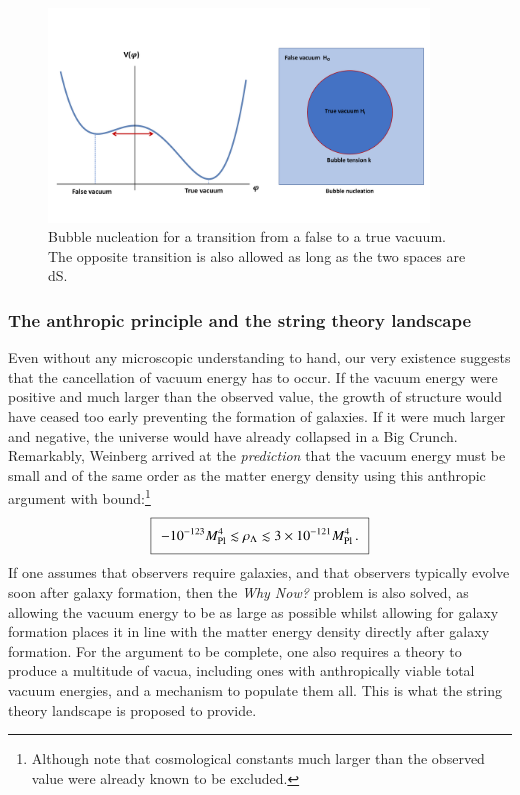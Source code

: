 \begin{figure}[ht]
\centering
\includegraphics[width = 0.9\textwidth]{Sections/Figures/VacuumTransition.pdf} 
\caption{Bubble nucleation for a transition from a false to a true vacuum. The opposite transition is also allowed as long as the two spaces are dS.}
\label{fig:BubbleNucleation}
\end{figure}

\subsubsection{The anthropic principle and the string theory landscape}
\label{ssec:landscape}

Even without any microscopic understanding to hand, our very existence suggests that the cancellation of vacuum energy has to occur. If the vacuum energy were positive and much larger than the observed value, the growth of structure would have ceased too early preventing the formation of galaxies. If it were much larger and negative, the universe would have already collapsed in a Big Crunch. Remarkably, Weinberg \cite{Weinberg2} arrived at the \emph{prediction} that the vacuum energy must be small and of the same order as the matter energy density using this anthropic argument with bound:\footnote{Although note that cosmological constants much larger than the observed value were already known to be excluded.}
\begin{equation}
\setlength\fboxsep{0.25cm}
\setlength\fboxrule{0.4pt}
\boxed{
-10^{-123} M_{\rm Pl}^4 \lesssim \rho_\Lambda \lesssim 3 \times 10^{-121} M_{\rm Pl}^4 \,. 
}
\label{E:Weinwin}
\end{equation}
If one assumes that observers require galaxies, and that observers typically evolve soon after galaxy formation, then the \emph{Why Now?} problem is also solved, as allowing the vacuum energy to be as large as possible whilst allowing for galaxy formation places it in line with the matter energy density directly after galaxy formation.  For the argument to be complete, one also requires a theory to produce a multitude of vacua, including ones with anthropically viable total vacuum energies, and a mechanism to populate them all. This is what the string theory landscape \cite{Susskind:2003kw} is proposed to provide.

